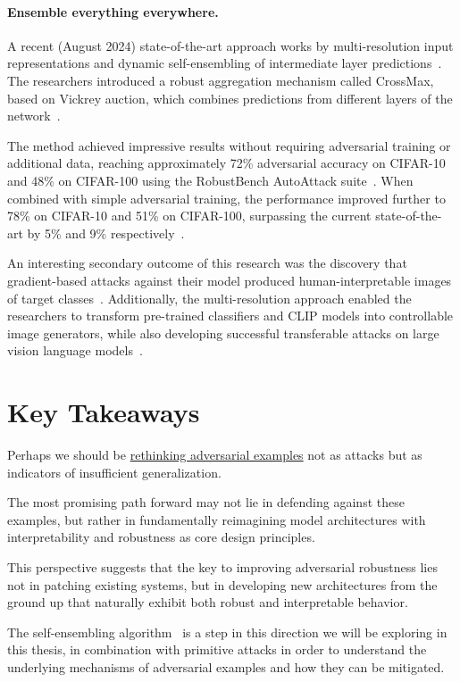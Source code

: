 \documentclass[a4paper, oneside]{discothesis}
\begin{document}
\paragraph{Ensemble everything everywhere.} A recent (August 2024) state-of-the-art approach works by multi-resolution input representations and dynamic self-ensembling of intermediate layer predictions~\cite{fort2024ensemble}. The researchers introduced a robust aggregation mechanism called CrossMax, based on Vickrey auction, which combines predictions from different layers of the network~\cite{fort2024ensemble}.

The method achieved impressive results without requiring adversarial training or additional data, reaching approximately 72\% adversarial accuracy on CIFAR-10 and 48\% on CIFAR-100 using the RobustBench AutoAttack suite~\cite{fort2024ensemble}. When combined with simple adversarial training, the performance improved further to 78\% on CIFAR-10 and 51\% on CIFAR-100, surpassing the current state-of-the-art by 5\% and 9\% respectively~\cite{fort2024ensemble}.

An interesting secondary outcome of this research was the discovery that gradient-based attacks against their model produced human-interpretable images of target classes~\cite{fort2024ensemble}. Additionally, the multi-resolution approach enabled the researchers to transform pre-trained classifiers and CLIP models into controllable image generators, while also developing successful transferable attacks on large vision language models~\cite{fort2024ensemble}.

\section{Key Takeaways}

Perhaps we should be \underline{rethinking adversarial examples} not as attacks but as indicators of insufficient generalization.

The most promising path forward may not lie in defending against these examples, but rather in fundamentally reimagining model architectures with interpretability and robustness as core design principles.

This perspective suggests that the key to improving adversarial robustness lies not in patching existing systems, but in developing new architectures from the ground up that naturally exhibit both robust and interpretable behavior.

The self-ensembling algorithm~\cite{fort2024ensemble} is a step in this direction we will be exploring in this thesis, in combination with primitive attacks in order to understand the underlying mechanisms of adversarial examples and how they can be mitigated.
\end{document}
